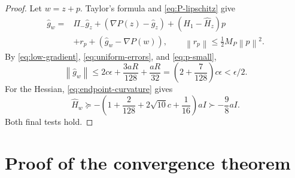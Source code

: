 \documentclass[11pt]{article}
\numberwithin{equation}{section}
\newcommand{\eps}{\epsilon}
\newcommand{\norm}[1]{\left\lVert#1\right\rVert}
\newcommand{\MP}{M_P}
\begin{document}
\begin{proof}
Let $w=z+p$. Taylor's formula and \eqref{eq:P-lipschitz} give
\[
\begin{split}
 \widehat g_w
 ={}&\Pi_-\widehat g_z
   +(\nabla P(z)-\widehat g_z)
   +(H_1-\widehat H_z)p\\
   &+r_p+(\widehat g_w-\nabla P(w)),
 \qquad \norm{r_p}\le\tfrac12\MP\norm p^2.
\end{split}
\]
By \eqref{eq:low-gradient}, \eqref{eq:uniform-errors}, and
\eqref{eq:p-small},
\[
 \norm{\widehat g_w}
 \le2c\eps+\frac{3aR}{128}+\frac{aR}{32}
 =\left(2+\frac7{128}\right)c\eps<\eps/2.
\]
For the Hessian, \eqref{eq:endpoint-curvature} gives
\[
 \widehat H_w\succeq
 -\left(1+\frac2{128}+2\sqrt{10}c+\frac1{16}\right)aI
 \succ-\frac98aI.
\]
Both final tests hold.
\end{proof}

\section{Proof of the convergence theorem}
\end{document}
